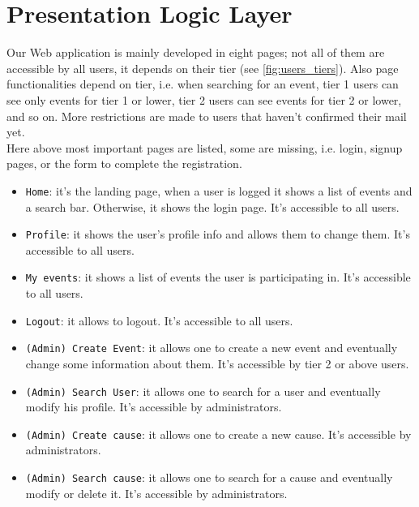 \section{Presentation Logic Layer}

Our Web application is mainly developed in eight pages; not all of them are accessible by all users, it depends on their tier (see \ref{fig:users_tiers}). Also page functionalities depend on tier, i.e. when searching for an event, tier 1 users can see only events for tier 1 or lower, tier 2 users can see events for tier 2 or lower, and so on. More restrictions are made to users that haven't confirmed their mail yet.\\
Here above most important pages are listed, some are missing, i.e. login, signup pages, or the form to complete the registration.

\begin{itemize}
    \item \texttt{Home}: it's the landing page, when a user is logged it shows a list of events and a search bar. Otherwise, it shows the login page. It's accessible to all users.
    \item \texttt{Profile}: it shows the user's profile info and allows them to change them. It's accessible to all users.
    \item \texttt{My events}: it shows a list of events the user is participating in. It's accessible to all users.
    \item \texttt{Logout}: it allows to logout. It's accessible to all users.
    \item \texttt{(Admin) Create Event}: it allows one to create a new event and eventually change some information about them. It's accessible by tier 2 or above users.
    \item \texttt{(Admin) Search User}: it allows one to search for a user and eventually modify his profile. It's accessible by administrators.
    \item \texttt{(Admin) Create cause}: it allows one to create a new cause. It's accessible by administrators.
    \item \texttt{(Admin) Search cause}: it allows one to search for a cause and eventually modify or delete it. It's accessible by administrators.
\end{itemize}


